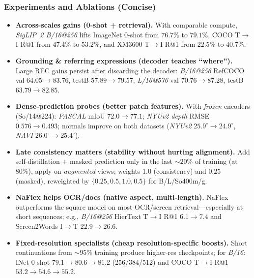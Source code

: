 \begin{enrichment}
\begin{enrichment}
        \subsubsection{Experiments and Ablations (Concise)}
        \begin{itemize}
            \item \textbf{Across-scales gains (0-shot + retrieval).}
            With comparable compute, \emph{SigLIP~2 B/16@256} lifts ImageNet 0-shot from $76.7\%$ to $\mathbf{79.1\%}$, COCO T$\!\to\!$I R@1 from $47.4\%$ to $\mathbf{53.2\%}$, and XM3600 T$\!\to\!$I R@1 from $22.5\%$ to $\mathbf{40.7\%}$.
            
            \item \textbf{Grounding \& referring expressions (decoder teaches ``where'').}
            Large REC gains persist after discarding the decoder: \emph{B/16@256} RefCOCO val $64.05\!\to\!\mathbf{83.76}$, testB $57.89\!\to\!\mathbf{79.57}$; \emph{L/16@576} val $70.76\!\to\!\mathbf{87.28}$, testB $63.79\!\to\!\mathbf{82.85}$.
            
            \item \textbf{Dense-prediction probes (better patch features).}
            With \emph{frozen} encoders (So/14@224): \emph{PASCAL} mIoU $72.0\!\to\!\mathbf{77.1}$; \emph{NYUv2 depth} RMSE $0.576\!\to\!\mathbf{0.493}$; normals improve on both datasets (\emph{NYUv2} $25.9^\circ\!\to\!\mathbf{24.9^\circ}$, \emph{NAVI} $26.0^\circ\!\to\!\mathbf{25.4^\circ}$).
            
            \item \textbf{Late consistency matters (stability without hurting alignment).}
            Add self-distillation + masked prediction only in the last $\sim\!20\%$ of training (at $80\%$), apply on \emph{augmented} views; weights $1.0$ (consistency) and $0.25$ (masked), reweighted by $\{0.25,0.5,1.0,0.5\}$ for B/L/So400m/g. 
            
            \item \textbf{NaFlex helps OCR/docs (native aspect, multi-length).}
            NaFlex outperforms the square model on most OCR/screen retrieval—especially at short sequences; e.g., \emph{B/16@256} HierText T$\!\to\!$I R@1 $6.1\!\to\!\mathbf{7.4}$ and Screen2Words I$\!\to\!$T $22.9\!\to\!\mathbf{26.6}$.
            
            \item \textbf{Fixed-resolution specialists (cheap resolution-specific boosts).}
            Short continuations from $\sim\!95\%$ training produce higher-res checkpoints; for \emph{B/16}: INet 0-shot $79.1\!\to\!80.6\!\to\!81.2$ (256/384/512) and COCO T$\!\to\!$I R@1 $53.2\!\to\!54.6\!\to\!55.2$.
            

\end{itemize}
\end{enrichment}
\end{enrichment}
